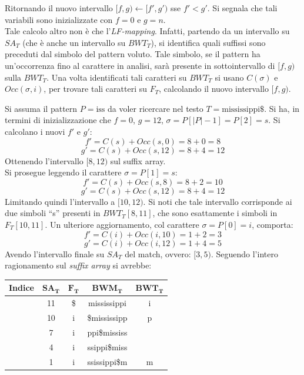 Ritornando il nuovo intervallo $[f, g)\gets [f', g')$ sse $f'< g'$.
Si segnala che tali variabili sono inizializzate con $f=0$ e $g=n$.\\
Tale calcolo altro non è che l'\textit{LF-mapping}. Infatti, partendo da un
intervallo su $SA_T$ (che è anche un intervallo su $BWT_T$), si identifica quali
suffissi sono preceduti dal simbolo del pattern voluto. Tale simbolo, se il
pattern ha un'occorrenza fino al carattere in analisi, sarà presente in
sottointervallo di $[f,g)$ sulla $BWT_T$. Una volta identificati tali caratteri
su $BWT_T$ si usano $C(\sigma)$ e $Occ(\sigma, i)$, per trovare tali caratteri
su $F_T$, calcolando il nuovo intervallo $[f,g)$.
\begin{esempio}
  Si assuma il pattern $P=\mbox{iss}$ da voler ricercare nel testo
  $T=\mbox{mississippi\$}$. 
  Si ha, in termini di inizializzazione che $f=0$, $g=12$,
  $\sigma=P[|P|-1]=P[2]=s$. Si calcolano i nuovi $f'$ e $g'$:
  \[f'=C(s)+Occ(s, 0)=8+0=8\]
  \[g'=C(s)+Occ(s, 12)=8+4=12\]
  Ottenendo l'intervallo $[8,12)$ sul suffix array.\\
  Si prosegue leggendo il carattere $\sigma=P[1]=s$:
  \[f'=C(s)+Occ(s, 8)=8+2=10\]
  \[g'=C(s)+Occ(s, 12)=8+4=12\]
  Limitando quindi l'intervallo a $[10,12)$. Si noti che tale intervallo
  corrisponde ai due simboli ``s'' presenti in $BWT_T[8,11]$, che sono
  esattamente i simboli in $F_T[10,11]$.
  Un ulteriore aggiornamento, col carattere $\sigma=P[0]=i$, comporta:
  \[f'=C(i)+Occ(i, 10)=1+2=3\]
  \[g'=C(i)+Occ(i, 12)=1+4=5\]
  Avendo l'intervallo finale su $SA_T$ del match, ovvero: $[3,5)$.
  Seguendo l'intero ragionamento sul \textit{suffix array} si avrebbe:
  \begin{table}[H]
    \centering
    \scriptsize
    \begin{tabular}{c|c|c|c|c} 
      \textbf{Indice} & $\mathbf{SA_T}$ & $\mathbf{F_T}$ & $\mathbf{BWM_T}$
      & $\mathbf{BWT_T}$\\ 
      \hline
      {\color{nordred}{0}} & 11 & \$ & {\color{nordred}{\$}}mississippi & i\\
      {\color{nordred}{1}} & 10 & i & {\color{nordred}{i}}\$mississipp & p\\
      {\color{nordred}{2}} & 7 & i & {\color{nordred}{i}}ppi\$mississ
      & {\color{nordgreen}{s}}\\
      {\color{nordred}{3}} & 4 & i & {\color{nordred}{i}}ssippi\$miss
      & {\color{nordgreen}{s}}\\
      {\color{nordred}{4}} & 1 & i & {\color{nordred}{i}}ssissippi\$m & m\\

\end{tabular}
\end{table}
\end{esempio}
